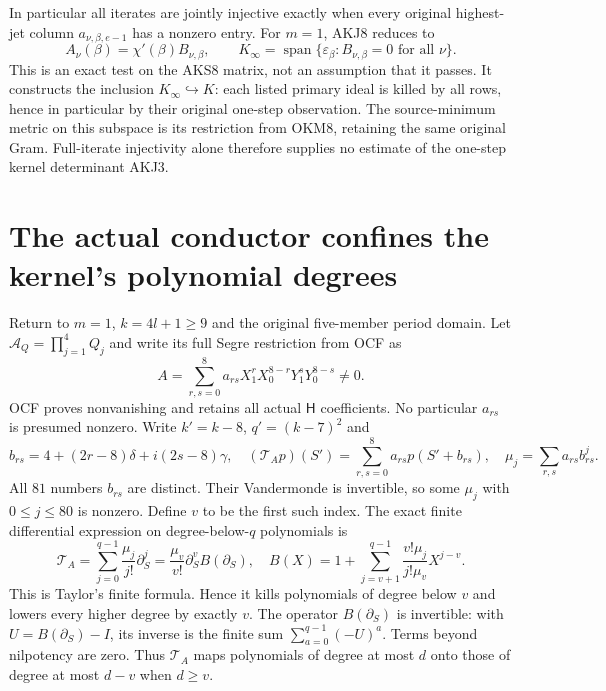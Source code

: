 \documentclass[11pt,a4paper]{article}
\begin{document}
In particular all iterates are jointly injective exactly when every
original highest-jet column $a_{\nu,\beta,e-1}$ has a nonzero entry.
For $m=1$, AKJ8 reduces to
\[
 A_\nu(\beta)=\chi'(\beta)B_{\nu,\beta},\qquad
 K_\infty=\operatorname{span}\{\varepsilon_\beta:
                         B_{\nu,\beta}=0\text{ for all }\nu\}.
 \tag{AKJ11}
\]
This is an exact test on the AKS8 matrix, not an assumption that it
passes. It constructs the inclusion $K_\infty\hookrightarrow K$:
each listed primary ideal is killed by all rows, hence in particular
by their original one-step observation. The source-minimum metric on
this subspace is its restriction from OKM8, retaining the same original
Gram. Full-iterate injectivity alone therefore supplies no estimate of
the one-step kernel determinant AKJ3.

\section{The actual conductor confines the kernel's polynomial degrees}
Return to $m=1$, $k=4l+1\ge9$ and the original five-member period domain.
Let $\mathcal A_Q=\prod_{j=1}^4Q_j$ and write its full Segre restriction
from OCF as
\[
 A=\sum_{r,s=0}^8a_{rs}
 X_1^rX_0^{8-r}Y_1^sY_0^{8-s}\ne0.
 \tag{AKJ12}
\]
OCF proves nonvanishing and retains all actual $\mathsf H$ coefficients.
No particular $a_{rs}$ is presumed nonzero. Write $k'=k-8$,
$q'=(k-7)^2$ and
\[
 b_{rs}=4+(2r-8)\delta+i(2s-8)\gamma,\quad
 (\mathcal T_Ap)(S')=\sum_{r,s=0}^8a_{rs}p(S'+b_{rs}),\quad
 \mu_j=\sum_{r,s}a_{rs}b_{rs}^j.
 \tag{AKJ13}
\]
All $81$ numbers $b_{rs}$ are distinct. Their Vandermonde is invertible,
so some $\mu_j$ with $0\le j\le80$ is nonzero. Define $v$ to be the first
such index. The exact finite differential expression on degree-below-$q$
polynomials is
\[
 \mathcal T_A=\sum_{j=0}^{q-1}\frac{\mu_j}{j!}\partial_S^j
 =\frac{\mu_v}{v!}\partial_S^v B(\partial_S),\quad
 B(X)=1+\sum_{j=v+1}^{q-1}\frac{v!\mu_j}{j!\mu_v}X^{j-v}.
 \tag{AKJ14}
\]
This is Taylor's finite formula. Hence it kills polynomials of degree
below $v$ and lowers every higher degree by exactly $v$. The operator
$B(\partial_S)$ is invertible: with $U=B(\partial_S)-I$, its inverse
is the finite sum $\sum_{a=0}^{q-1}(-U)^a$. Terms beyond nilpotency are
zero. Thus $\mathcal T_A$ maps polynomials of degree at most $d$
onto those of degree at most $d-v$ when $d\ge v$.
\end{document}
